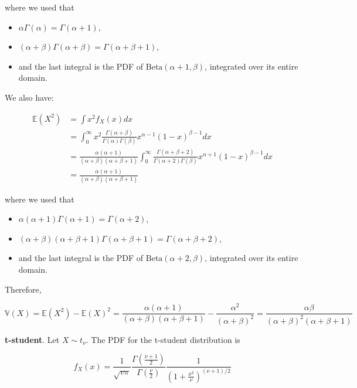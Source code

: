 where we used that

\begin{itemize}[tightlist]
\item
  \(\alpha \Gamma(\alpha) = \Gamma(\alpha + 1)\),
\item
  \((\alpha + \beta) \Gamma(\alpha + \beta) = \Gamma(\alpha + \beta + 1)\),
\item
  and the last integral is the PDF of
  \(\text{Beta}(\alpha + 1, \beta)\), integrated over its entire domain.
\end{itemize}

We also have:

\begin{align}
\mathbb{E}(X^2) 
&= \int x^2 f_X(x) dx \\
&= \int_0^\infty x^2 \frac{\Gamma(\alpha + \beta)}{\Gamma(\alpha) \Gamma(\beta)} x^{\alpha - 1}(1 - x)^{\beta - 1} dx \\
&= \frac{\alpha (\alpha + 1)}{(\alpha + \beta)(\alpha + \beta + 1)} \int_0^\infty \frac{\Gamma(\alpha + \beta + 2)}{\Gamma(\alpha + 2) \Gamma(\beta)} x^{\alpha + 1}(1 - x)^{\beta - 1} dx \\
&= \frac{\alpha (\alpha + 1)}{(\alpha + \beta)(\alpha + \beta + 1)}
\end{align}

where we used that

\begin{itemize}[tightlist]
\item
  \(\alpha (\alpha + 1) \Gamma(\alpha + 1) = \Gamma(\alpha + 2)\),
\item
  \((\alpha + \beta) (\alpha + \beta + 1) \Gamma(\alpha + \beta + 1) = \Gamma(\alpha + \beta + 2)\),
\item
  and the last integral is the PDF of
  \(\text{Beta}(\alpha + 2, \beta)\), integrated over its entire domain.
\end{itemize}

Therefore,

\[ \mathbb{V}(X) = \mathbb{E}(X^2) - \mathbb{E}(X)^2 = \frac{\alpha (\alpha + 1)}{(\alpha + \beta)(\alpha + \beta + 1)} - \frac{\alpha^2}{(\alpha + \beta)^2} = \frac{\alpha \beta}{(\alpha + \beta)^2 (\alpha + \beta + 1)} \]

\textbf{t-student}. Let \(X \sim t_\nu\). The PDF for the t-student
distribution is

\[ f_X(x) = \frac{1}{\sqrt{v \pi}} \frac{\Gamma\left(\frac{\nu + 1}{2}\right)}{\Gamma\left(\frac{\nu}{2}\right)} \frac{1}{\left(1 + \frac{x^2}{\nu} \right)^{(\nu + 1)/2}} \]


